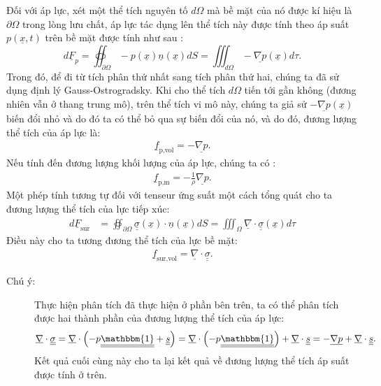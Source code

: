 \documentclass[../../../main.tex]{subfiles}
\begin{document}
	Đối với áp lực, xét một thể tích nguyên tố $d\Omega$ mà bề mặt của nó được kí hiệu là $\partial\Omega$ trong lòng lưu chất, áp lực tác dụng lên thể tích này được tính theo áp suất $p\left(\underline{x},t\right)$ trên bề mặt được tính như sau :
		\[
			d\underline{F}_p=\oiint_{\partial\Omega}-p\left(\underline{x}\right)\underline{n}\left(\underline{x}\right)dS=\iiint_{d\Omega}-\underline{\nabla p}\left(\underline{x}\right)d\tau.
		\]
	Trong đó, để đi từ tích phân thứ nhất sang tích phân thứ hai, chúng ta đã sử dụng định lý Gauss-Ostrogradsky. Khi cho thể tích $d\Omega$ tiến tới gần không (đương nhiên vẫn ở thang trung mô), trên thể tích vi mô này, chúng ta giả sử $-\underline{\nabla p}\left(\underline{x}\right)$ biến đổi nhỏ và do đó ta có thể bỏ qua sự biến đổi của nó, và do đó, đương lượng thể tích của áp lực là:
	\begin{align}
		\boxed{\underline{f}_{\text{p,vol}}=-\underline{\nabla p}}.
	\end{align}
	Nếu tính đến đương lượng khối lượng của áp lực, chúng ta có :
		\begin{equation}
			\begin{aligned}
				\boxed{
					\underline{f}_{\text{p,m}}=-\frac{1}{\rho}\underline{\nabla p}.
				}
			\end{aligned}
		\end{equation}
	Một phép tính tương tự đối với tenseur ứng suất một cách tổng quát cho ta đương lượng thể tích của lực tiếp xúc:
		\[
			\begin{aligned}
				d\underline{F}_{\text{sur}}&=\oiint_{\partial\Omega}\underline{\underline{\sigma}}\left(\underline{x}\right)\cdot\underline{n}\left(\underline{x}\right)dS=\iiint_{\Omega}\underline{\nabla}\cdot\underline{\underline{\sigma}}\left(\underline{x}\right)d\tau
			\end{aligned}
		\]
	Điều này cho ta tương đương thể tích của lực bề mặt:
		\begin{align}
			\underline{f}_{\text{sur,vol}}=\underline{\nabla}\cdot\underline{\underline{\sigma}}.
		\end{align}
	\begin{description}
		\item[Chú ý:] Thực hiện phân tích đã thực hiện ở phần bên trên, ta có thể phân tích được hai thành phần của đương lượng thể tích của áp lực:
			\[
				\begin{aligned}
					\underline{\nabla}\cdot\underline{\underline{\sigma}}&=\underline{\nabla}\cdot\left(-p\underline{\underline{\mathbbm{1}}}+\underline{\underline{s}}\right)=\underline{\nabla}\cdot\left(-p\underline{\underline{\mathbbm{1}}}\right)+\underline{\nabla}\cdot\underline{\underline{s}}=-\underline{\nabla p}+\underline{\nabla}\cdot\underline{\underline{s}}.
				\end{aligned}
				\]
			Kết quả cuối cùng này cho ta lại kết quả về đương lượng thể tích áp suất được tính ở trên.
			\end{description}
\end{document}
